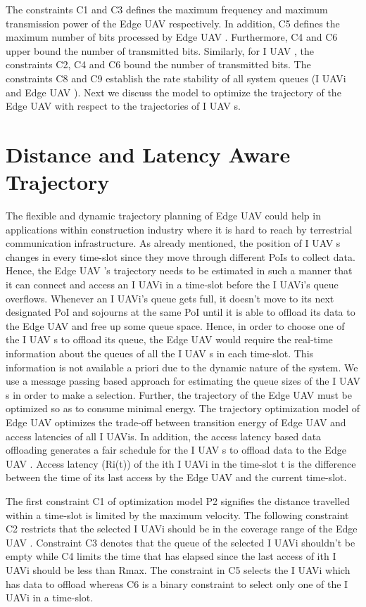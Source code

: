 \documentclass{article}
\begin{document}
\begin{multicols}{2}
The constraints C1 and C3 defines the maximum
frequency and maximum transmission power of the
Edge UAV respectively. In addition, C5 defines the maximum
number of bits processed by Edge UAV . Furthermore,
C4 and C6 upper bound the number of transmitted
bits. Similarly, for I UAV , the constraints C2, C4 and C6
bound the number of transmitted bits. The constraints
C8 and C9 establish the rate stability of all system queues
(I UAVi and Edge UAV ). Next we discuss the model to
optimize the trajectory of the Edge UAV with respect to
the trajectories of I UAV s.

\section{Distance and Latency Aware Trajectory}
The flexible and dynamic trajectory planning of
Edge UAV could help in applications within construction
industry where it is hard to reach by terrestrial communication
infrastructure. As already mentioned, the position
of I UAV s changes in every time-slot since they
move through different PoIs to collect data. Hence, the
Edge UAV ’s trajectory needs to be estimated in such a
manner that it can connect and access an I UAVi in a
time-slot before the I UAVi’s queue overflows. Whenever
an I UAVi’s queue gets full, it doesn’t move to its next
designated PoI and sojourns at the same PoI until it is
able to offload its data to the Edge UAV and free up
some queue space. Hence, in order to choose one of the
I UAV s to offload its queue, the Edge UAV would require
the real-time information about the queues of all the
I UAV s in each time-slot. This information is not available
a priori due to the dynamic nature of the system. We
use a message passing based approach for estimating the
queue sizes of the I UAV s in order to make a selection.
Further, the trajectory of the Edge UAV must be optimized
so as to consume minimal energy. The trajectory
optimization model of Edge UAV optimizes the trade-off
between transition energy of Edge UAV and access latencies
of all I UAVis. In addition, the access latency based
data offloading generates a fair schedule for the I UAV s
to offload data to the Edge UAV . Access latency (Ri(t))
of the ith I UAVi in the time-slot t is the difference between
the time of its last access by the Edge UAV and
the current time-slot.
    
The first constraint C1 of optimization model P2 signifies
the distance travelled within a time-slot is limited by the
maximum velocity. The following constraint C2 restricts
that the selected I UAVi should be in the coverage range
of the Edge UAV . Constraint C3 denotes that the queue
of the selected I UAVi shouldn’t be empty while C4 limits
the time that has elapsed since the last access of ith
I UAVi should be less than Rmax. The constraint in C5
selects the I UAVi which has data to offload whereas C6 is a binary constraint to select only one of the I UAVi in
a time-slot.


\end{multicols}
\end{document}
